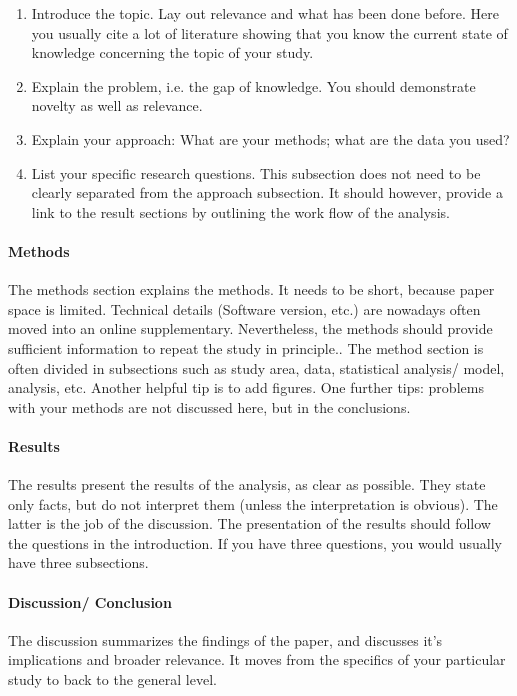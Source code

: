 \documentclass{tufte-book}
\begin{document}
\begin{enumerate}
\item Introduce the topic. Lay out relevance and what has been done before. Here you usually cite a lot of literature showing that you know the current state of knowledge concerning the topic of your study.
\item Explain the problem, i.e. the gap of knowledge. You should demonstrate novelty as well as relevance.
\item Explain your approach: What are your methods; what are the data you used?
\item List your specific research questions. This subsection does not need to be clearly separated from the approach subsection. It should however, provide a link to the result sections by outlining the work flow of the analysis.
\end{enumerate}

\paragraph{Methods} The methods section explains the methods. It needs to be short, because paper space is limited. Technical details (Software version, etc.) are nowadays often moved into an online supplementary. Nevertheless, the methods should provide sufficient information to repeat the study in principle.. The method section is often divided in subsections such as study area, data, statistical analysis/ model, analysis, etc. Another helpful tip is to add figures. One further tips: problems with your methods are not discussed here, but in the conclusions. 


\paragraph{Results} The results present the results of the analysis, as clear as possible. They state only facts, but do not interpret them (unless the interpretation is obvious). The latter is the job of the discussion. The presentation of the results should follow the questions in the introduction. If you have three questions, you would usually have three subsections. 

\paragraph{Discussion/ Conclusion} The discussion summarizes the findings of the paper, and discusses it's implications and broader relevance. It moves from the specifics of your particular study to back to the general level. 
\end{document}
